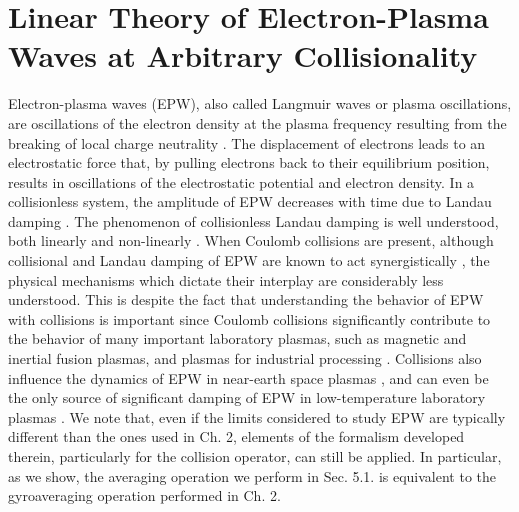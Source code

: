 \chapter{Linear Theory of Electron-Plasma Waves at Arbitrary Collisionality}
\label{ch:epw}

Electron-plasma waves (EPW), also called Langmuir waves or plasma oscillations, are oscillations of the electron density at the plasma frequency resulting from the breaking of local charge neutrality \citep{Bohm1949,Malmberg1966}.
%
The displacement of electrons leads to an electrostatic force that, by pulling electrons back to their equilibrium position, results in oscillations of the electrostatic potential and electron density.
%
In a collisionless system, the amplitude of EPW decreases with time due to Landau damping \citep{Landau1946}.
%
The phenomenon of collisionless Landau damping  is well understood, both linearly and non-linearly \citep{Dawson1961,ONeil1965,Zakharov1972,Morales1972,Mouhot2011a}.
%
When Coulomb collisions are present, {although} collisional and Landau damping of EPW {are known to} act synergistically {\citep{Brantov2012}, the physical mechanisms which dictate their interplay are considerably less understood}.
%
This is despite the fact that understanding the behavior of EPW with collisions is important since Coulomb collisions significantly contribute to the behavior of many important laboratory plasmas, such as magnetic \citep{Scott2007} and inertial fusion \citep{Lindl2004} plasmas, {and} plasmas for industrial processing \citep{Lieberman2005}.
%
Collisions also influence the dynamics of EPW in near-earth space plasmas \citep{Jordanova1996}, and can even be the only source of significant damping {of EPW in low-temperature laboratory plasmas} \citep{Banks2017}.
%
We note that, even if the limits considered to study EPW are typically different than the ones used in Ch. 2, elements of the formalism developed therein, particularly for the collision operator, can still be applied.
%
In particular, as we show, the averaging operation we perform in Sec. 5.1. is equivalent to the gyroaveraging operation performed in Ch. 2.

